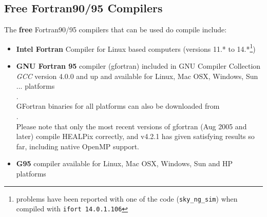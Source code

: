 \documentclass[12pt,twoside]{article}
\begin{document}
\subsection{Free Fortran90/95 Compilers}
\label{sec:freef90compilers}
The {\bf free} Fortran90/95 compilers that can be used do compile \healpix include: 
    \begin{itemize}
      \item {\bf Intel Fortran} Compiler for Linux based computers (versions
11.* to 14.*\footnote{problems have been reported with one of the code ({\tt sky\_ng\_sim}) when compiled with
{\tt ifort 14.0.1.106}}) \hfill \\
      \item {\bf GNU Fortran 95} compiler (gfortran) included in GNU Compiler Collection {\em GCC} version 4.0.0
         and up and available for Linux, Mac OSX, Windows, Sun ... platforms
         \hfill \\
          . \hfill \\
         GFortran binaries for all platforms can also be downloaded from  \hfill \\
          . \hfill \\
         Please note that only the most recent versions of gfortran (Aug 2005
         and later) compile HEALPix correctly, and v4.2.1 has given satisfying
         results so far, including native OpenMP support.
     \item {\bf G95} compiler available for Linux, Mac OSX, Windows, Sun and HP platforms
         \hfill \\ 
    \end{itemize}
\end{document}
